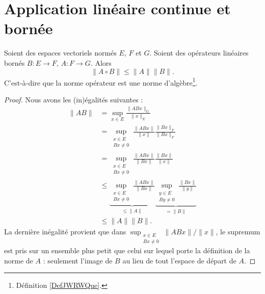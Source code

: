 \section{Application linéaire continue et bornée}

\begin{lemma}   \label{LEMooFITMooBBBWGI}
	Soient des espaces vectoriels normés \( E\), \( F\) et \( G\). Soient des opérateurs linéaires bornés \( B\colon E\to F\), \( A\colon F\to G\). Alors
	\begin{equation}
		\| A\circ B \|\leq \| A \|\| B \|.
	\end{equation}
	C'est-à-dire que la norme opérateur est une norme d'algèbre\footnote{Définition \ref{DefJWRWQue}.}.
\end{lemma}

\begin{proof}
	Nous avons les (in)égalités suivantes :
	\begin{subequations}
		\begin{align}
			\| AB \| & =\sup_{x\in E}\frac{ \| ABx \|_G }{ \| x \|_E } \\
			         & =\sup_{\substack{x\in E                         \\Bx\neq 0}}\frac{ \| ABx \| }{ \| x \| }\frac{ \| Bx \|_F }{ \| Bx \|_F }\\
			         & =\sup_{\substack{x\in E                         \\Bx\neq 0}}\frac{ \| ABx \| }{ \| Bx \| }\frac{ \| Bx \| }{ \| x \| }\\
			         & \leq\underbrace{\sup_{\substack{x\in E          \\Bx\neq 0}}\frac{ \| ABx \| }{ \| Bx \| }}_{\leq\| A \|}\underbrace{\sup_{\substack{y\in E\\By\neq 0}}\frac{ \| Bx \| }{ \| y \| }}_{=\| B \|}\\
			         & \leq \| A \|\| B \|.
		\end{align}
	\end{subequations}
	La dernière inégalité provient que dans \( \sup_{\substack{x\in E\\Bx\neq 0}}\| ABx \|/\| x \|\), le supremum est pris sur un ensemble plus petit que celui sur lequel porte la définition de la norme de \( A\) : seulement l'image de \( B\) au lieu de tout l'espace de départ de \( A\).
\end{proof}

